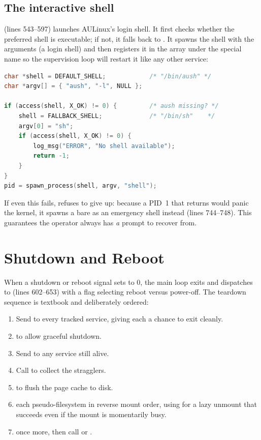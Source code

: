 \subsection{The interactive shell}
\label{sec:init-shell}

 (lines 543--597) launches AULinux's login shell. It first
checks whether the preferred shell  is executable; if not, it
falls back to . It spawns the shell with the arguments
 (a login shell) and then registers it in the 
array under the special name  so the supervision loop will restart
it like any other service:

\begin{lstlisting}[language=C, caption={Selecting and launching the login shell}]
char *shell = DEFAULT_SHELL;            /* "/bin/aush" */
char *argv[] = { "aush", "-l", NULL };

if (access(shell, X_OK) != 0) {         /* aush missing? */
    shell = FALLBACK_SHELL;             /* "/bin/sh"    */
    argv[0] = "sh";
    if (access(shell, X_OK) != 0) {
        log_msg("ERROR", "No shell available");
        return -1;
    }
}
pid = spawn_process(shell, argv, "shell");
\end{lstlisting}

If even this fails,  refuses to give up: because a PID~1 that
returns would panic the kernel, it spawns a bare  as an emergency
shell instead (lines 744--748). This guarantees the operator always has \emph{a}
prompt to recover from.

\section{Shutdown and Reboot}

When a shutdown or reboot signal sets  to 0, the main loop exits
and  dispatches to  (lines 602--653) with a
flag selecting reboot versus power-off. The teardown sequence is textbook and
deliberately ordered:

\begin{enumerate}
  \item Send  to every tracked service, giving each a chance to
        exit cleanly.
  \item {} to allow graceful shutdown.
  \item Send  to any service still alive.
  \item Call  to collect the stragglers.
  \item {} to flush the page cache to disk.
  \item {} each pseudo-filesystem in reverse mount order, using
         for a lazy unmount that succeeds even if the mount is
        momentarily busy.
  \item {} once more, then call  or
        .
\end{enumerate}

